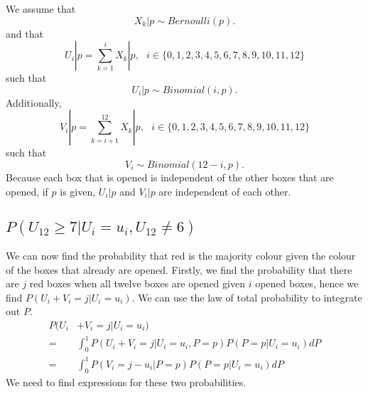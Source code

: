 \documentclass{article}
\begin{document}
We assume that 
\begin{equation*}
    X_k|p \sim Bernoulli(p).
\end{equation*}
and that
\begin{equation*}
    U_i|p = \sum_{k=1}^i X_k|p, \: \: \: i \in \{0, 1, 2,3,4,5,6,7,8,9,10,11,12\}
\end{equation*}
such that 
\begin{equation*}
    U_i|p \sim Binomial(i,p).
\end{equation*}
Additionally, 
\begin{equation*}
    V_i|p = \sum_{k=i+1}^{12} X_k|p,\: \: \: i \in \{0, 1, 2,3,4,5,6,7,8,9,10,11,12\}
\end{equation*}
such that
\begin{equation*}
    V_i \sim Binomial(12-i,p).
\end{equation*}
Because each box that is opened is independent of the other boxes that are opened, if $p$ is given, $U_i|p$ and $V_i|p$ are independent of each other.

\subsection{$P(U_{12}\geq 7|U_i=u_i,U_{12}\neq6)$}
We can now find the probability that red is the majority colour given the colour of the boxes that already are opened. Firstly, we find the probability that there are $j$ red boxes when all twelve boxes are opened given $i$ opened boxes, hence we find $P(U_i+V_i = j | U_i=u_i)$.
We can use the law of total probability to integrate out $P$.
\begin{equation} 
\label{prob_red_major}
    \begin{aligned}
        P(U_i&+V_i = j | U_i=u_i) \\[6pt]
        =& \int_0^1 P(U_i+V_i = j | U_i=u_i, P=p) P(P=p| U_i=u_i) dP \\[6pt]
        =& \int_0^1 P(V_i = j-u_i | P=p) P(P=p| U_i=u_i) dP 
    \end{aligned}
\end{equation}
We need to find expressions for these two probabilities. 
\end{document}
